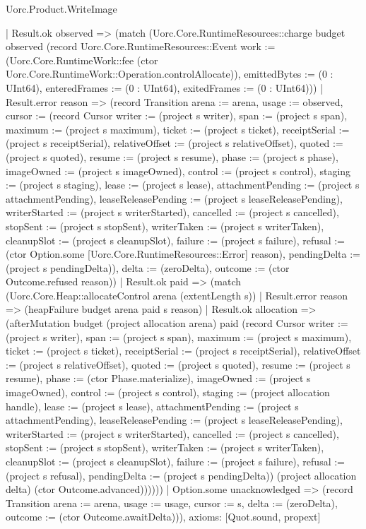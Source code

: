 \begin{lexlean}{Uorc.Product.WriteImage}
\begin{semanticmodule}
{        | Result.ok observed => (match (Uorc.Core.RuntimeResources::charge budget observed (record Uorc.Core.RuntimeResources::Event {work := (Uorc.Core.RuntimeWork::fee (ctor Uorc.Core.RuntimeWork::Operation.controlAllocate)), emittedBytes := (0 : UInt64), enteredFrames := (0 : UInt64), exitedFrames := (0 : UInt64)}))
          | Result.error reason => (record Transition {arena := arena, usage := observed, cursor := (record Cursor {writer := (project s writer), span := (project s span), maximum := (project s maximum), ticket := (project s ticket), receiptSerial := (project s receiptSerial), relativeOffset := (project s relativeOffset), quoted := (project s quoted), resume := (project s resume), phase := (project s phase), imageOwned := (project s imageOwned), control := (project s control), staging := (project s staging), lease := (project s lease), attachmentPending := (project s attachmentPending), leaseReleasePending := (project s leaseReleasePending), writerStarted := (project s writerStarted), cancelled := (project s cancelled), stopSent := (project s stopSent), writerTaken := (project s writerTaken), cleanupSlot := (project s cleanupSlot), failure := (project s failure), refusal := (ctor Option.some [Uorc.Core.RuntimeResources::Error] reason), pendingDelta := (project s pendingDelta)}), delta := (zeroDelta), outcome := (ctor Outcome.refused reason)})
          | Result.ok paid => (match (Uorc.Core.Heap::allocateControl arena (extentLength s))
            | Result.error reason => (heapFailure budget arena paid s reason)
            | Result.ok allocation => (afterMutation budget (project allocation arena) paid (record Cursor {writer := (project s writer), span := (project s span), maximum := (project s maximum), ticket := (project s ticket), receiptSerial := (project s receiptSerial), relativeOffset := (project s relativeOffset), quoted := (project s quoted), resume := (project s resume), phase := (ctor Phase.materialize), imageOwned := (project s imageOwned), control := (project s control), staging := (project allocation handle), lease := (project s lease), attachmentPending := (project s attachmentPending), leaseReleasePending := (project s leaseReleasePending), writerStarted := (project s writerStarted), cancelled := (project s cancelled), stopSent := (project s stopSent), writerTaken := (project s writerTaken), cleanupSlot := (project s cleanupSlot), failure := (project s failure), refusal := (project s refusal), pendingDelta := (project s pendingDelta)}) (project allocation delta) (ctor Outcome.advanced))))))
    | Option.some unacknowledged => (record Transition {arena := arena, usage := usage, cursor := s, delta := (zeroDelta), outcome := (ctor Outcome.awaitDelta)})),
  axioms: [Quot.sound, propext]
}


\end{semanticmodule}
\end{lexlean}
